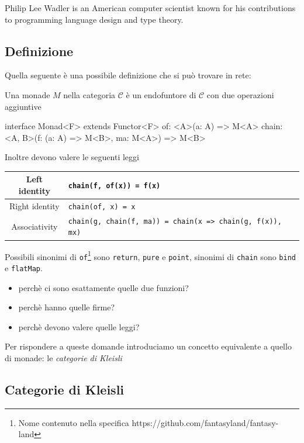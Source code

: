 \documentclass[12pt]{article}
\theoremstyle{definition}
\newenvironment{code}
  {\vspace{0.5cm} \VerbatimEnvironment\begin{typescriptcode}}
  {\end{typescriptcode} \vspace{0.2cm}}
\begin{document}
Philip Lee Wadler is an American computer scientist known for his contributions to programming language design and type theory.

\subsection{Definizione}

Quella seguente è una possibile definizione che si può trovare in rete:

Una monade $M$ nella categoria $\mathcal{C}$ è un endofuntore di $\mathcal{C}$ con due operazioni aggiuntive

\begin{code}
interface Monad<F> extends Functor<F> {
  of: <A>(a: A) => M<A>
  chain: <A, B>(f: (a: A) => M<B>, ma: M<A>) => M<B>
}
\end{code}

Inoltre devono valere le seguenti leggi

\begin{center}
\bgroup
\def\arraystretch{1.5}
\begin{tabular}{ |c|p{10cm}| }
\hline
Left identity & \texttt{chain(f, of(x)) = f(x)} \\
\hline
Right identity & \texttt{chain(of, x) = x} \\
\hline
Associativity & \texttt{chain(g, chain(f, ma)) = chain(x => chain(g, f(x)), mx)} \\
\hline
\end{tabular}
\egroup
\end{center}

Possibili sinonimi di \texttt{of}\footnote{Nome contenuto nella specifica https://github.com/fantasyland/fantasy-land} sono \texttt{return}, \texttt{pure} e \texttt{point}, sinonimi di \texttt{chain} sono \texttt{bind} e \texttt{flatMap}.

\begin{itemize}
  \item perchè ci sono esattamente quelle due funzioni?
  \item perchè hanno quelle firme?
  \item perchè devono valere quelle leggi?
\end{itemize}

Per rispondere a queste domande introduciamo un concetto equivalente a quello di monade: le \emph{categorie di Kleisli}

\subsection{Categorie di Kleisli}
\end{document}
